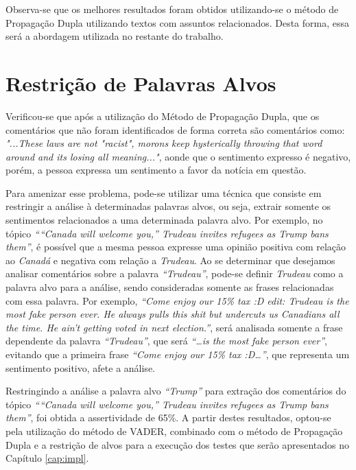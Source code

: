 Observa-se que os melhores resultados foram obtidos utilizando-se o método de
Propagação Dupla utilizando textos com assuntos relacionados. Desta forma, essa
será a abordagem utilizada no restante do trabalho.

\section{Restrição de Palavras Alvos}

Verificou-se que após a utilização do Método de Propagação Dupla, que os
comentários que não foram identificados de forma correta são comentários como: \textit{"...These laws are not "racist", morons keep hysterically throwing that word around and
its losing all meaning..."}, aonde que o sentimento expresso é negativo, porém,
a pessoa expressa um sentimento a favor da notícia em questão. 

Para amenizar esse problema, pode-se utilizar uma técnica que consiste em
restringir a análise à determinadas palavras alvos, ou seja, extrair somente os
sentimentos relacionados a uma determinada palavra alvo.
Por exemplo, no tópico \textit{````Canada will welcome you,'' Trudeau invites refugees as Trump bans them''}, é possível que a mesma pessoa expresse uma opinião positiva com relação
ao \textit{Canadá} e negativa com relação a \textit{Trudeau}. Ao se determinar
que desejamos analisar comentários sobre a palavra \textit{``Trudeau''},
pode-se definir \textit{Trudeau} como a palavra alvo para a análise,
sendo consideradas somente as frases relacionadas com essa palavra. Por exemplo, \textit{``Come enjoy our 15\%
tax :D edit: Trudeau is the most fake person ever. He always pulls this shit but
undercuts us Canadians all the time. He ain't getting voted in next
election.''}, será analisada somente a frase dependente da palavra
\textit{``Trudeau''}, que será \textit{``\ldots is the most fake person ever''},
evitando que a primeira frase \textit{``Come enjoy our 15\% tax :D\ldots''}, que
representa um sentimento positivo, afete a análise.

Restringindo a análise a palavra alvo \textit{``Trump''} para extração dos
comentários do tópico \textit{````Canada will welcome you,'' Trudeau invites refugees as Trump
bans them''}, foi obtida a assertividade de 65\%. A partir destes resultados,
optou-se pela utilização do método de \ac{VADER}, combinado com o método de Propagação Dupla e a
restrição de alvos para a execução dos testes que serão apresentados no Capítulo
\ref{cap:impl}.



